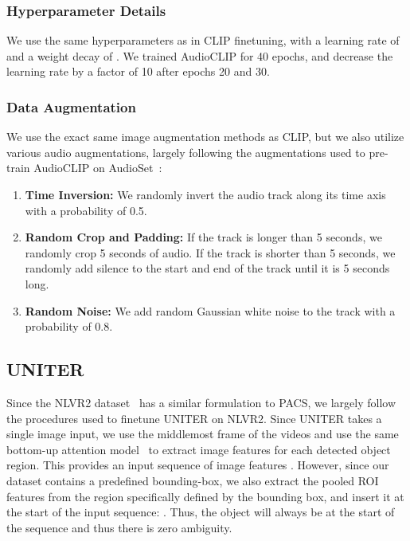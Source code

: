 \documentclass[runningheads]{llncs}
\newcommand{\names}{\textsc{PACS}}
\begin{document}
\subsubsection{Hyperparameter Details} We use the same hyperparameters as in CLIP finetuning, with a learning rate of  and a weight decay of . We trained AudioCLIP for 40 epochs, and decrease the learning rate by a factor of 10 after epochs 20 and 30. 

\subsubsection{Data Augmentation} We use the exact same image augmentation methods as CLIP, but we also utilize various audio augmentations, largely following the augmentations used to pre-train AudioCLIP on AudioSet~\cite{guzhov2021audioclip}:

\begin{enumerate}
    \item \textbf{Time Inversion:} We randomly invert the audio track along its time axis with a probability of 0.5.
    \item \textbf{Random Crop and Padding:} If the track is longer than 5 seconds, we randomly crop 5 seconds of audio. If the track is shorter than 5 seconds, we randomly add silence to the start and end of the track until it is 5 seconds long.
    \item \textbf{Random Noise:} We add random Gaussian white noise to the track with a probability of 0.8. 
\end{enumerate}

\subsection{UNITER~\cite{chen2020uniter}}

Since the NLVR2 dataset~\cite{suhr2019nlvr2} has a similar formulation to \names, we largely follow the procedures used to finetune UNITER on NLVR2. Since UNITER takes a single image input, we use the middlemost frame of the videos and use the same bottom-up attention model~\cite{anderson2017bottomup} to extract image features for each detected object region. This provides an input sequence of image features . However, since our dataset contains a predefined bounding-box, we also extract the pooled ROI features  from the region specifically defined by the bounding box, and insert it at the start of the input sequence: . Thus, the object will always be at the start of the sequence and thus there is  zero ambiguity. 
\end{document}
